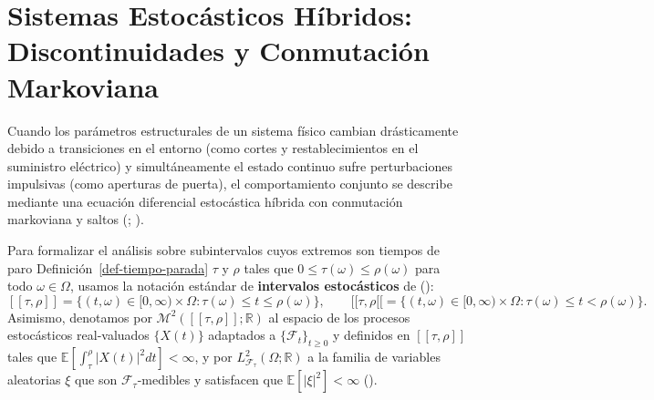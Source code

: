 \documentclass[
  spanish,
  letterpaper,
  DIV=11,
  numbers=noendperiod]{scrreprt}
\theoremstyle{plain}
\theoremstyle{plain}
\theoremstyle{plain}
\theoremstyle{definition}
\theoremstyle{remark}
\begin{document}
\section{Sistemas Estocásticos Híbridos: Discontinuidades y Conmutación
Markoviana}\label{sistemas-estocuxe1sticos-huxedbridos-discontinuidades-y-conmutaciuxf3n-markoviana}

Cuando los parámetros estructurales de un sistema físico cambian
drásticamente debido a transiciones en el entorno (como cortes y
restablecimientos en el suministro eléctrico) y simultáneamente el
estado continuo sufre perturbaciones impulsivas (como aperturas de
puerta), el comportamiento conjunto se describe mediante una ecuación
diferencial estocástica híbrida con conmutación markoviana y saltos
(;
).

Para formalizar el análisis sobre subintervalos cuyos extremos son
tiempos de paro Definición~\ref{def-tiempo-parada} \(\tau\) y \(\rho\)
tales que \(0 \le \tau(\omega) \le \rho(\omega)\) para todo
\(\omega \in \Omega\), usamos la notación estándar de \textbf{intervalos
estocásticos} de (): \[
[[\tau, \rho]] = \{(t, \omega) \in [0, \infty) \times \Omega : \tau(\omega) \le t \le \rho(\omega)\}, \qquad [[\tau, \rho[[ = \{(t, \omega) \in [0, \infty) \times \Omega : \tau(\omega) \le t < \rho(\omega)\}.
\] Asimismo, denotamos por \(\mathcal{M}^2([[\tau, \rho]]; \mathbb{R})\)
al espacio de los procesos estocásticos real-valuados \(\{X(t)\}\)
adaptados a \(\{\mathcal{F}_t\}_{t \ge 0}\) y definidos en
\([[\tau, \rho]]\) tales que
\(\mathbb{E}\left[\int_\tau^\rho \vert X(t) \vert^2 dt\right] < \infty\),
y por \(L^2_{\mathcal{F}_\tau}(\Omega; \mathbb{R})\) a la familia de
variables aleatorias \(\xi\) que son \(\mathcal{F}_\tau\)-medibles y
satisfacen que \(\mathbb{E}[\vert \xi \vert^2] < \infty\)
().
\end{document}
